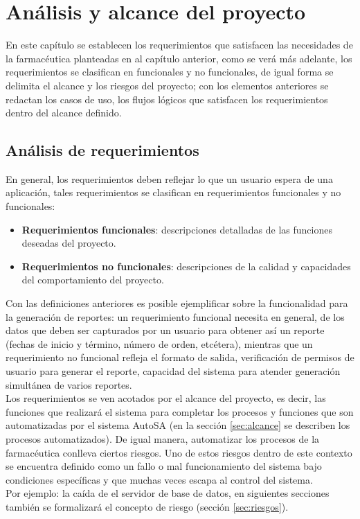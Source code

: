 \chapter{Análisis y alcance del proyecto}\label{cap2}

En este capítulo se establecen los requerimientos que satisfacen las necesidades de la farmacéutica planteadas en al capítulo anterior, como se verá más adelante, los requerimientos se clasifican en funcionales y no funcionales, de igual forma se delimita el alcance y los riesgos del proyecto; con los elementos anteriores se redactan los casos de uso, los flujos lógicos que satisfacen los requerimientos dentro del alcance definido.


\section{Análisis de requerimientos}\label{sec:req-ana}
En general, los requerimientos deben reflejar lo que un usuario espera de una aplicación, tales requerimientos se clasifican en requerimientos funcionales y no funcionales:
\begin{itemize}
\item \textbf{Requerimientos funcionales}: descripciones detalladas de las funciones deseadas del proyecto\cite{WileyBegSE}.
\item \textbf{Requerimientos no funcionales}: descripciones de la calidad y capacidades del comportamiento del proyecto\cite{WileyBegSE}.
\end{itemize}
Con las definiciones anteriores es posible ejemplificar sobre la funcionalidad para la generación de reportes: un requerimiento funcional necesita en general, de los datos que deben ser capturados por un usuario para obtener así un reporte (fechas de inicio y término, número de orden, etcétera), mientras que un requerimiento no funcional refleja el formato de salida, verificación de permisos de usuario para generar el reporte,  capacidad del sistema para atender generación simultánea de varios reportes.\\
Los requerimientos se ven acotados por el alcance del proyecto, es decir, las funciones que realizará el sistema para completar los procesos y funciones que son automatizadas por el sistema AutoSA\cite{WileyBegSE} (en la sección \ref{sec:alcance} se describen los procesos automatizados). De igual manera, automatizar los procesos de la farmacéutica conlleva ciertos riesgos. Uno de estos riesgos dentro de este contexto se encuentra definido como un fallo o mal funcionamiento del sistema bajo condiciones específicas y que muchas veces escapa al control del sistema.\\
Por ejemplo: la caída de el servidor de base de datos, en siguientes secciones también se formalizará el concepto de riesgo (sección \ref{sec:riesgos}).



